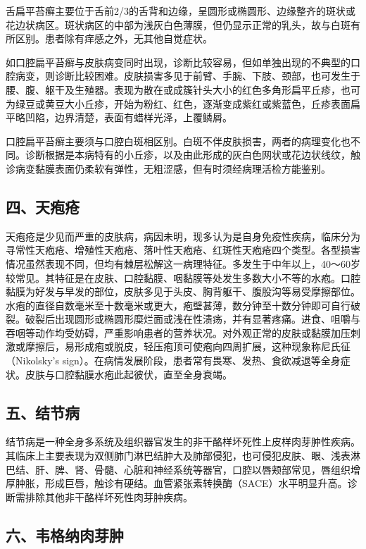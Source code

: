 舌扁平苔癣主要位于舌前2/3的舌背和边缘，呈圆形或椭圆形、边缘整齐的斑状或花边状病区。斑状病区的中部为浅灰白色薄膜，但仍显示正常的乳头，故与白斑有所区别。患者除有痒感之外，无其他自觉症状。

如口腔扁平苔癣与皮肤病变同时出现，诊断比较容易，但如单独出现的不典型的口腔病变，则诊断比较困难。皮肤损害多见于前臂、手腕、下肢、颈部，也可发生于腰、腹、躯干及生殖器。表现为散在或成簇针头大小的红色多角形扁平丘疹，也可为绿豆或黄豆大小丘疹，开始为粉红、红色，逐渐变成紫红或紫蓝色，丘疹表面扁平略凹陷，边界清楚，表面有蜡样光泽，上覆鳞屑。

口腔扁平苔癣主要须与口腔白斑相区别。白斑不伴皮肤损害，两者的病理变化也不同。诊断根据是本病特有的小丘疹，以及由此形成的灰白色网状或花边状线纹，触诊病变黏膜表面仍柔软有弹性，无粗涩感，但有时须经病理活检方能鉴别。

\subsection{四、天疱疮}

天疱疮是少见而严重的皮肤病，病因未明，现多认为是自身免疫性疾病，临床分为寻常性天疱疮、增殖性天疱疮、落叶性天疱疮、红斑性天疱疮四个类型。各型损害情况虽然表现不同，但均有棘层松解这一病理特征。多发生于中年以上，40～60岁较常见。其特征是在皮肤、口腔黏膜、咽黏膜等处发生多数大小不等的水疱。口腔黏膜为好发与早发的部位，皮肤多见于头皮、胸背躯干、腹股沟等易受摩擦部位。水疱的直径自数毫米至十数毫米或更大，疱壁甚薄，数分钟至十数分钟即可自行破裂。破裂后出现圆形或椭圆形糜烂面或浅在性溃疡，并有显著疼痛。进食、咀嚼与吞咽等动作均受妨碍，严重影响患者的营养状况。对外观正常的皮肤或黏膜加压刺激或摩擦后，易形成疱或脱皮，轻压疱顶可使疱向四周扩展，这种现象称尼氏征（Nikolsky's
sign）。在病情发展阶段，患者常有畏寒、发热、食欲减退等全身症状。皮肤与口腔黏膜水疱此起彼伏，直至全身衰竭。

\subsection{五、结节病}

结节病是一种全身多系统及组织器官发生的非干酪样坏死性上皮样肉芽肿性疾病。其临床上主要表现为双侧肺门淋巴结肿大及肺部侵犯，也可侵犯皮肤、眼、浅表淋巴结、肝、脾、肾、骨髓、心脏和神经系统等器官，口腔以唇颊部常见，唇组织增厚肿胀，形成巨唇，触诊有硬结。血管紧张素转换酶（SACE）水平明显升高。诊断需排除其他非干酪样坏死性肉芽肿疾病。

\subsection{六、韦格纳肉芽肿}

